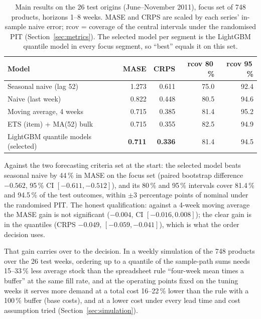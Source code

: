 \documentclass[11pt,a4paper]{article}
\begin{document}
\begin{table}[ht]
  \centering
  \small
  \caption{Main results on the 26 test origins (June--November 2011), focus set of 748
    products, horizons 1--8 weeks. MASE and CRPS are scaled by each series' in-sample naive
    error; rcov = coverage of the central intervals under the randomised PIT
    (Section~\ref{sec:metrics}). The selected model per segment is the LightGBM quantile model
    in every focus segment, so ``best'' equals it on this set.}
  \label{tab:summary}
  \begin{tabular}{lrrrr}
    \toprule
    Model & MASE & CRPS & rcov 80\,\% & rcov 95\,\% \\
    \midrule
    Seasonal naive (lag 52) & 1.273 & 0.611 & 75.0 & 92.4 \\
    Naive (last week) & 0.822 & 0.448 & 80.5 & 94.6 \\
    Moving average, 4 weeks & 0.715 & 0.385 & 81.4 & 95.2 \\
    ETS (item) + MA(52) bulk & 0.715 & 0.355 & 82.5 & 94.9 \\
    LightGBM quantile models (selected) & \textbf{0.711} & \textbf{0.336} & 81.4 & 94.5 \\
    \bottomrule
  \end{tabular}
\end{table}

Against the two forecasting criteria set at the start: the selected model beats seasonal naive by
44\,\% in MASE on the focus set (paired bootstrap difference $-0.562$, 95\,\% CI
$[-0.611, -0.512]$), and its 80\,\% and 95\,\% intervals cover 81.4\,\% and 94.5\,\% of the
test outcomes, within $\pm 3$ percentage points of nominal under the randomised PIT. The
honest qualification: against a 4-week moving average the MASE gain is not significant
($-0.004$, CI $[-0.016, 0.008]$); the clear gain is in the quantiles (CRPS $-0.049$,
$[-0.059, -0.041]$), which is what the order decision uses.

That gain carries over to the decision. In a weekly simulation of the 748 products over the 26
test weeks, ordering up to a quantile of the sample-path sums needs 15--33\,\% less average
stock than the spreadsheet rule ``four-week mean times a buffer'' at the same fill rate, and at
the operating points fixed on the tuning weeks it serves more demand at a total cost 16--22\,\%
lower than the rule with a 100\,\% buffer (base costs), and at a lower cost under every lead time and cost assumption tried (Section~\ref{sec:simulation}).
\end{document}
